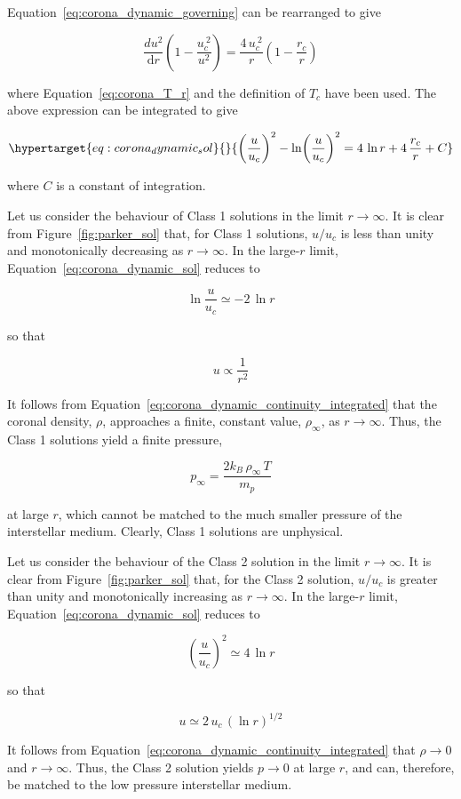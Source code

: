\documentclass[
  notoc %
]{tufte-book}
\begin{document}
Equation~\ref{eq:corona_dynamic_governing} can be rearranged to give

\[
\frac{du^2}{\mathrm{d}r}\left(1-\frac{u_c^{~2}}{u^2}\right) = \frac{4\,u_c^{~2}}{r} \left(1-\frac{r_c}{r}\right)
\]

where Equation~\ref{eq:corona_T_r} and the definition of \(T_c\) have
been used. The above expression can be integrated to give

\begin{equation}\protect\hypertarget{eq:corona_dynamic_sol}{}{
\left(\frac{u}{u_c}\right)^2 -\ln\!\left(\frac{u}{u_c}\right)^2 = 4\,\ln r + 4\,\frac{r_c}{r} + C
}\label{eq:corona_dynamic_sol}\end{equation}

where \(C\) is a constant of integration.

Let us consider the behaviour of Class 1 solutions in the limit
\(r\rightarrow\infty\). It is clear from Figure~\ref{fig:parker_sol}
that, for Class 1 solutions, \(u/u_c\) is less than unity and
monotonically decreasing as \(r\rightarrow\infty\). In the large-\(r\)
limit, Equation~\ref{eq:corona_dynamic_sol} reduces to

\[
\ln\frac{u}{u_c} \simeq -2\,\ln r
\]

so that

\[
u\propto \frac{1}{r^2}
\]

It follows from Equation~\ref{eq:corona_dynamic_continuity_integrated}
that the coronal density, \(\rho\), approaches a finite, constant value,
\(\rho_\infty\), as \(r\rightarrow\infty\). Thus, the Class 1 solutions
yield a finite pressure,

\[
p_\infty= \frac{2k_B\,\rho_\infty\,T}{m_p}
\]

at large \(r\), which cannot be matched to the much smaller pressure of
the interstellar medium. Clearly, Class 1 solutions are unphysical.

Let us consider the behaviour of the Class 2 solution in the limit
\(r\rightarrow\infty\). It is clear from Figure~\ref{fig:parker_sol}
that, for the Class 2 solution, \(u/u_c\) is greater than unity and
monotonically increasing as \(r\rightarrow\infty\). In the large-\(r\)
limit, Equation~\ref{eq:corona_dynamic_sol} reduces to

\[
\left(\frac{u}{u_c}\right)^2 \simeq 4\,\ln r
\]

so that

\[
u \simeq 2\,u_c\,(\ln r)^{1/2}
\]

It follows from Equation~\ref{eq:corona_dynamic_continuity_integrated}
that \(\rho\rightarrow 0\) and \(r\rightarrow\infty\). Thus, the Class 2
solution yields \(p\rightarrow 0\) at large \(r\), and can, therefore,
be matched to the low pressure interstellar medium.
\end{document}
